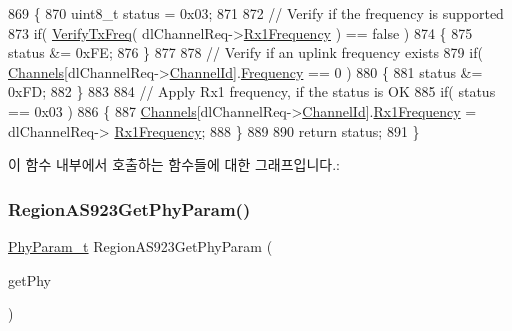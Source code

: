 \begin{DoxyCode}
869 \{
870     uint8\_t status = 0x03;
871 
872     \textcolor{comment}{// Verify if the frequency is supported}
873     \textcolor{keywordflow}{if}( \mbox{\hyperlink{_region_a_s923_8c_af6b3cfa164d4105815aaaa55f02d723e}{VerifyTxFreq}}( dlChannelReq->\mbox{\hyperlink{structs_dl_channel_req_params_a8a564b8635b12d5f0f348ae177dd92e1}{Rx1Frequency}} ) == \textcolor{keyword}{false} )
874     \{
875         status &= 0xFE;
876     \}
877 
878     \textcolor{comment}{// Verify if an uplink frequency exists}
879     \textcolor{keywordflow}{if}( \mbox{\hyperlink{_region_a_s923_8c_a02bae2504563543865d6b0e81c48ab61}{Channels}}[dlChannelReq->\mbox{\hyperlink{structs_dl_channel_req_params_ae23f953dc29c360e56a3c856404a3276}{ChannelId}}].\mbox{\hyperlink{structs_channel_params_ade3d190636488dad9a89b19446b7acf1}{Frequency}} == 0 )
880     \{
881         status &= 0xFD;
882     \}
883 
884     \textcolor{comment}{// Apply Rx1 frequency, if the status is OK}
885     \textcolor{keywordflow}{if}( status == 0x03 )
886     \{
887         \mbox{\hyperlink{_region_a_s923_8c_a02bae2504563543865d6b0e81c48ab61}{Channels}}[dlChannelReq->\mbox{\hyperlink{structs_dl_channel_req_params_ae23f953dc29c360e56a3c856404a3276}{ChannelId}}].\mbox{\hyperlink{structs_channel_params_a8a564b8635b12d5f0f348ae177dd92e1}{Rx1Frequency}} = dlChannelReq->
      \mbox{\hyperlink{structs_dl_channel_req_params_a8a564b8635b12d5f0f348ae177dd92e1}{Rx1Frequency}};
888     \}
889 
890     \textcolor{keywordflow}{return} status;
891 \}
\end{DoxyCode}
이 함수 내부에서 호출하는 함수들에 대한 그래프입니다.\+:
\mbox{\label{group___r_e_g_i_o_n_a_s923_ga20508dee35c0f25ff507478c5235fdeb}} 
\subsubsection{\texorpdfstring{Region\+A\+S923\+Get\+Phy\+Param()}{RegionAS923GetPhyParam()}}
{\footnotesize\ttfamily \mbox{\hyperlink{group___r_e_g_i_o_n_gaed159b26e5c4677236b6e8677019db30}{Phy\+Param\+\_\+t}} Region\+A\+S923\+Get\+Phy\+Param (\begin{DoxyParamCaption}\item[{\mbox{\hyperlink{group___r_e_g_i_o_n_gab471483fff904f4f89bbc03f7fc380ab}{Get\+Phy\+Params\+\_\+t}} $\ast$}]{get\+Phy }\end{DoxyParamCaption})}



